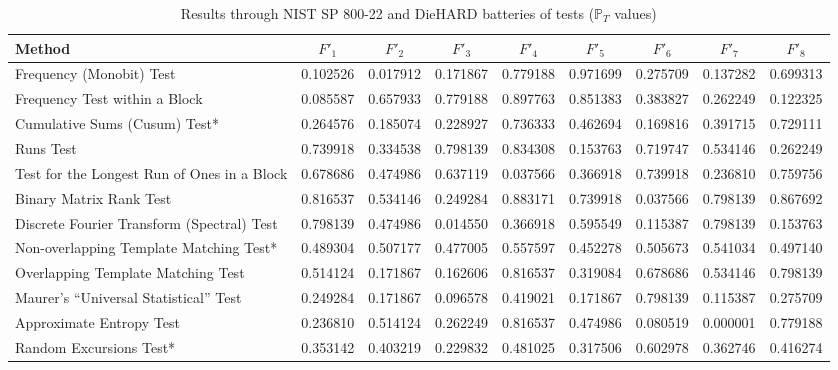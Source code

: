 \documentclass[conference]{IEEEtran}
\begin{document}
\begin{table*}[t]
\renewcommand{\arraystretch}{1.3}
\caption{Results through NIST SP 800-22 and DieHARD batteries of tests ($\mathbb{P}_T$ values)}
\label{The passing rate}
\centering
  \begin{tabular}{|l||c|c|c|c|c|c|c|c|}
    \hline
Method & $F'_1$ &  $F'_2$ & $F'_3$ & $F'_4$ & $F'_5$ & $F'_6$ & $F'_7$ & $F'_8$\\ \hline\hline


Frequency (Monobit) Test            &  0.102526 &  0.017912 &  0.171867 &  0.779188 &  0.971699 &  0.275709 &  0.137282 &    0.699313 \\ \hline
Frequency Test within a Block             &  0.085587 &  0.657933 &  0.779188 &  0.897763 &  0.851383 &  0.383827 &  0.262249 &    0.122325 \\ \hline
Cumulative Sums (Cusum) Test*             &  0.264576 &  0.185074 &  0.228927 &  0.736333 &  0.462694 &  0.169816 &  0.391715 &    0.729111\\ \hline
Runs Test                    &  0.739918 &  0.334538 &  0.798139 &  0.834308 &  0.153763 &  0.719747 &  0.534146 &    0.262249 \\ \hline
Test for the Longest Run of Ones in a Block     &  0.678686 &  0.474986 &  0.637119 &  0.037566 &  0.366918 &  0.739918 &  0.236810 &    0.759756 \\ \hline
Binary Matrix Rank Test                & 0.816537 &  0.534146 &  0.249284 &  0.883171 &  0.739918 &  0.037566 &  0.798139 &    0.867692 \\ \hline
Discrete Fourier Transform (Spectral) Test     &   0.798139 &  0.474986 &  0.014550 &  0.366918 &  0.595549 &  0.115387 &  0.798139 &    0.153763 \\ \hline
Non-overlapping Template Matching Test*        &  0.489304 &  0.507177 &  0.477005 &  0.557597 &  0.452278 &  0.505673 &  0.541034 &    0.497140 \\ \hline
Overlapping Template Matching Test        &  0.514124 &  0.171867 &  0.162606 &  0.816537 &  0.319084 &  0.678686 &  0.534146 &    0.798139 \\ \hline
Maurer’s “Universal Statistical” Test         &   0.249284 &  0.171867 &  0.096578 &  0.419021 &  0.171867 &  0.798139 &  0.115387 &    0.275709 \\ \hline
Approximate Entropy Test             & 0.236810 &  0.514124 &  0.262249 &  0.816537 &  0.474986 &  0.080519 &  0.000001 &    0.779188\\ \hline
Random Excursions Test*                &  0.353142 &  0.403219 &  0.229832 &  0.481025 &  0.317506 &  0.602978 &  0.362746 &    0.416274 \\ \hline

\end{tabular}
\end{table*}
\end{document}
